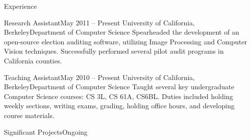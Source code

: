 \documentclass{resume}
\begin{document}
\begin{component}{Experience}
	\begin{position}{Research Assistant}{May 2011 -- Present}
	 	{University of California, Berkeley}{Department of Computer Science}
	{Spearheaded the development of an open-source election auditing software,
     utilizing Image Processing and Computer Vision techniques. 
     Successfully performed
         several pilot audit programs in California counties.}
	\end{position}

	\begin{position}{Teaching Assistant}{May 2010 -- Present}
		{University of California, Berkeley}{Department of Computer Science}
	{Taught several key undergraduate Computer Science courses: CS 3L, CS 61A, CS6BL. 
	 Duties included holding weekly sections, writing exams, grading, 
	holding office hours, and developing course materials.}
	\end{position}

	\begin{position}{Significant Projects}{Ongoing}
		{}{\vspace{-2.0em}}


\end{position}
\end{component}
\end{document}
